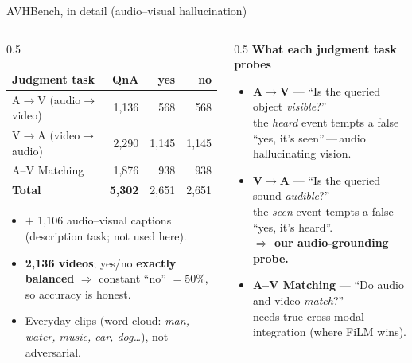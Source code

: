 \documentclass[aspectratio=169,11pt]{beamer}
\begin{document}
\begin{frame}{AVHBench, in detail (audio--visual hallucination)}
\begin{columns}[T]
\begin{column}{0.5\textwidth}
\footnotesize
\setlength{\tabcolsep}{4pt}
\begin{tabular}{@{}lrrr@{}}
\toprule
Judgment task & QnA & yes & no \\
\midrule
A$\to$V (audio$\to$video) & 1,136 & 568 & 568 \\
V$\to$A (video$\to$audio) & 2,290 & 1,145 & 1,145 \\
A--V Matching             & 1,876 & 938 & 938 \\
\midrule
\textbf{Total}            & \textbf{5,302} & 2,651 & 2,651 \\
\bottomrule
\end{tabular}
\par\vspace{0.4em}
\begin{itemize}\scriptsize
\item $+$ 1,106 audio--visual captions (description task; not used here).
\item \textbf{2,136 videos}; yes/no \textbf{exactly balanced} $\Rightarrow$ constant ``no'' $=50\%$, so accuracy is honest.
\item Everyday clips (word cloud: \emph{man, water, music, car, dog\dots}), not adversarial.
\end{itemize}
\end{column}
\begin{column}{0.5\textwidth}\scriptsize
\textbf{What each judgment task probes}
\smallskip
\begin{itemize}
\item \textbf{A$\to$V} --- ``Is the queried object \emph{visible}?''\\
the \emph{heard} event tempts a false ``yes, it's seen''\,---\,audio hallucinating vision.
\item \textbf{V$\to$A} --- ``Is the queried sound \emph{audible}?''\\
the \emph{seen} event tempts a false ``yes, it's heard''.\\
\textbf{$\Rightarrow$ our audio-grounding probe.}
\item \textbf{A--V Matching} --- ``Do audio and video \emph{match}?''\\
needs true cross-modal integration (where FiLM wins).
\end{itemize}
\end{column}
\end{columns}
\end{frame}
\end{document}
